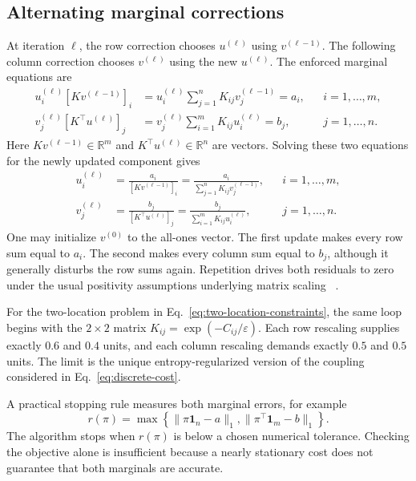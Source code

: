 \documentclass[11pt]{article}
\newcommand{\R}{\mathbb{R}}
\begin{document}
\subsection{Alternating marginal corrections}

At iteration $\ell$, the row correction chooses $u^{(\ell)}$ using
$v^{(\ell-1)}$. The following column correction chooses $v^{(\ell)}$ using
the new $u^{(\ell)}$. The enforced marginal equations are
\begin{equation}
  \begin{aligned}
    u_i^{(\ell)}[Kv^{(\ell-1)}]_i
      &=u_i^{(\ell)}\sum_{j=1}^{n}K_{ij}v_j^{(\ell-1)}=a_i,
      &&i=1,\ldots,m,\\
    v_j^{(\ell)}[K^\top u^{(\ell)}]_j
      &=v_j^{(\ell)}\sum_{i=1}^{m}K_{ij}u_i^{(\ell)}=b_j,
      &&j=1,\ldots,n.
  \end{aligned}
  \label{eq:sinkhorn-fixed-point}
\end{equation}
Here $Kv^{(\ell-1)}\in\R^m$ and $K^\top u^{(\ell)}\in\R^n$ are vectors.
Solving these two equations for the newly updated component gives
\begin{equation}
  \begin{aligned}
    u_i^{(\ell)}
      &=\frac{a_i}{[Kv^{(\ell-1)}]_i}
       =\frac{a_i}{\sum_{j=1}^{n}K_{ij}v_j^{(\ell-1)}},
       &&i=1,\ldots,m,\\
    v_j^{(\ell)}
      &=\frac{b_j}{[K^\top u^{(\ell)}]_j}
       =\frac{b_j}{\sum_{i=1}^{m}K_{ij}u_i^{(\ell)}},
       &&j=1,\ldots,n.
  \end{aligned}
  \label{eq:sinkhorn-updates}
\end{equation}
One may initialize $v^{(0)}$ to the all-ones vector. The first update makes every row sum equal
to $a_i$. The second makes every column sum equal to $b_j$, although it
generally disturbs the row sums again. Repetition drives both residuals to
zero under the usual positivity assumptions underlying matrix scaling
~\cite{sinkhorn-1964}.

For the two-location problem in Eq.~\eqref{eq:two-location-constraints}, the
same loop begins with the $2\times2$ matrix
$K_{ij}=\exp(-C_{ij}/\varepsilon)$. Each row rescaling supplies exactly
$0.6$ and $0.4$ units, and each column rescaling demands exactly $0.5$ and
$0.5$ units. The limit is the unique entropy-regularized version of the
coupling considered in Eq.~\eqref{eq:discrete-cost}.

A practical stopping rule measures both marginal errors, for example
\begin{equation}
  r(\pi)=
  \max\left\{
    \lVert\pi\boldsymbol{1}_n-a\rVert_1,
    \lVert\pi^\top\boldsymbol{1}_m-b\rVert_1
  \right\}.
  \label{eq:sinkhorn-residual}
\end{equation}
The algorithm stops when $r(\pi)$ is below a chosen numerical tolerance.
Checking the objective alone is insufficient because a nearly stationary
cost does not guarantee that both marginals are accurate.
\end{document}
